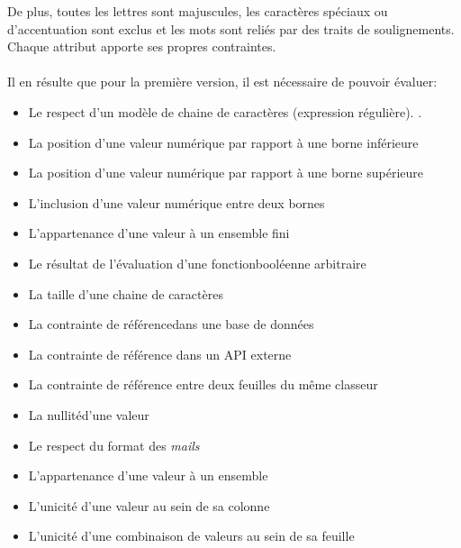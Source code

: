 De plus, toutes les lettres sont majuscules, les caractères spéciaux ou d'accentuation sont exclus et les mots sont reliés par des traits de soulignements.
Chaque attribut apporte ses propres contraintes.

\paragraph{}
Il en résulte que pour la première version, il est nécessaire de pouvoir évaluer:
\begin{itemize}
    \item Le respect d'un modèle de chaine de caractères (expression régulière\fnmark).
    .
    \item La position d'une valeur numérique par rapport à une borne inférieure
    \item La position d'une valeur numérique par rapport à une borne supérieure
    \item L'inclusion d'une valeur numérique entre deux bornes
    \item L'appartenance d'une valeur à un ensemble fini
    \item Le résultat de l'évaluation d'une fonction\fnmark booléenne arbitraire
    \item La taille d'une chaine de caractères
    \item La contrainte de référence\fnmark dans une base de données
    \item La contrainte de référence dans un API externe
    \item La contrainte de référence entre deux feuilles du même classeur
    \item La nullité\fnmark d'une valeur
    \item Le respect du format des \textit{mails}
    \item L'appartenance d'une valeur à un ensemble
    \item L'unicité d'une valeur au sein de sa colonne
    \item L'unicité d'une combinaison de valeurs au sein de sa feuille
\end{itemize}

